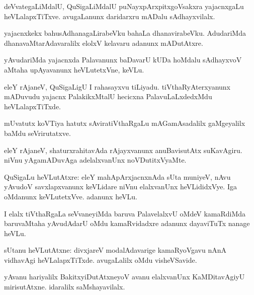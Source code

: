 \documentclass{article}
\begin{document}
\begin{mn}
deVvategaLiMdalU, QuSigaLiMdalU puNayxpArxpitxgoVsakxra yajacnxgaLu heVLalapxTiTxve. avugaLanunx 
daridarxru mADalu sAdhayxvilalx.
\end{mn}

\begin{mn}
yajacnxkekx bahusAdhanagaLirabeVku bahaLa dhanavirabeVku. AdudariMda dhanavaMtarAdavaralilx 
elolxV kelavaru adanunx mADutAtxre.
\end{mn}

\begin{mn}
yAvudariMda yajacnxda Palavanunx baDavarU kUDa hoMdalu sAdhayxvoV aMtaha upAyavanunx heVLutetxVne, 
keVLu.
\end{mn}

\begin{mn}
eleY rAjaneV, QuSigaLigU I rahasayxvu tiLiyadu. tiVthaRyAterxyanunx mADuvudu yajacnx 
PalakikxMtalU hecicxna PalavuLaLxdedxMdu heVLalapxTiTxde.
\end{mn}

\begin{mn}
mUvatutx koVTiya hatutx sAviratiVthaRgaLu mAGamAsadalilx gaMgeyalilx baMdu seVrirutatxve.
\end{mn}

\begin{mn}
eleY rAjaneV, shaturxrahitavAda rAjayxvanunx anuBavisutAtx suKavAgiru. niVnu yAgamADuvAga 
adelalxvanUnx noVDutitxVyaMte.
\end{mn}

\begin{mn}
QuSigaLu heVLutAtxre: eleY mahApArxjacnxnAda sUta muniyeV, nAvu yAvudoV savxlapxvanunx keVLidare 
niVnu elalxvanUnx heVLididxVye. Iga oMdanunx keVLutetxVve. adanunx heVLu.
\end{mn}

\begin{mn}
I elalx tiVthaRgaLa seVvaneyiMda baruva PalavelalxvU oMdeV kamaRdiMda baruvaMtaha yAvudAdarU oMdu 
kamaRvidadxre adanunx dayaviTuTx nanage heVLu.
\end{mn}

\begin{mn}
sUtanu heVLutAtxne: divxjareV modalAdavarige kamaRyoVgavu nAnA vidhavAgi heVLalapxTiTxde. 
avugaLalilx oMdu visheVSavide.
\end{mn}

\begin{mn}
yAvanu hariyalilx BakitxyiDutAtxneyoV avanu elalxvanUnx KaMDitavAgiyU mirisutAtxne. idaralilx 
saMshayavilalx.
\end{mn}
\end{document}
